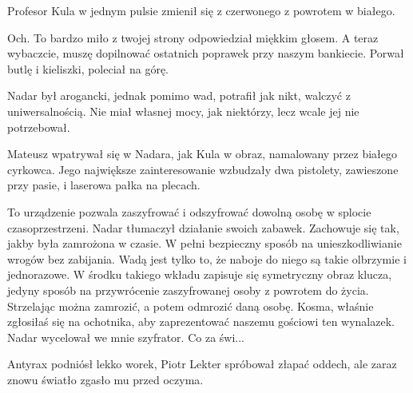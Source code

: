 Profesor Kula w jednym pulsie zmienił się z czerwonego z powrotem w białego.

\begin{dialogue}
\ds{} Och. To bardzo miło z twojej strony \dm{} odpowiedział miękkim głosem. \dm{} A teraz wybaczcie, muszę dopilnować ostatnich poprawek przy naszym bankiecie. \dm{}
Porwał butlę i kieliszki, poleciał na górę.
\end{dialogue}

Nadar był arogancki, jednak pomimo wad, potrafił jak nikt, walczyć z uniwersalnością.
Nie miał własnej mocy, jak niektórzy, lecz wcale jej nie potrzebował.

Mateusz wpatrywał się w Nadara, jak Kula w obraz, namalowany przez białego cyrkowca.
Jego największe zainteresowanie wzbudzały dwa pistolety, zawieszone przy pasie, i laserowa pałka na plecach.

\begin{dialogue}
\ds{} To urządzenie pozwala zaszyfrować i odszyfrować dowolną osobę w splocie czasoprzestrzeni. \dm{} Nadar tłumaczył działanie swoich zabawek. \dm{}
Zachowuje się tak, jakby była zamrożona w czasie.
W pełni bezpieczny sposób na unieszkodliwianie wrogów bez zabijania.
Wadą jest tylko to, że naboje do niego są takie olbrzymie i jednorazowe.
W środku takiego wkładu zapisuje się symetryczny obraz klucza, jedyny sposób na przywrócenie zaszyfrowanej osoby z powrotem do życia.
Strzelając można zamrozić, a potem odmrozić daną osobę.
Kosma, właśnie zgłosiłaś się na ochotnika, aby zaprezentować naszemu gościowi ten wynalazek. \dm{} Nadar wycelował we mnie szyfrator. Co za świ...
\end{dialogue}

\divider{}

Antyrax podniósł lekko worek, Piotr Lekter spróbował złapać oddech, ale zaraz znowu światło zgasło mu przed oczyma.

\divider{}

